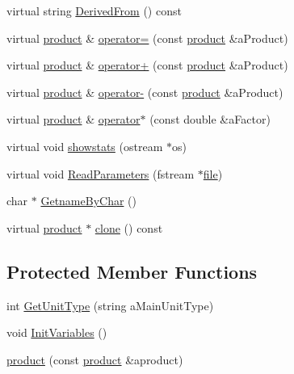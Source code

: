 \begin{DoxyCompactItemize}
virtual string \hyperlink{classproduct_a57ad202aca39d005745e104f91349908}{DerivedFrom} () const 
\item 
virtual \hyperlink{classproduct}{product} \& \hyperlink{classproduct_afa55a9466d7f5a287bae17100289733e}{operator=} (const \hyperlink{classproduct}{product} \&aProduct)
\item 
virtual \hyperlink{classproduct}{product} \& \hyperlink{classproduct_aa7ec97f48aa6b8c4549359aeb07fdfb8}{operator+} (const \hyperlink{classproduct}{product} \&aProduct)
\item 
virtual \hyperlink{classproduct}{product} \& \hyperlink{classproduct_aad3b7e2ec5a3a9dfe3199ea7575a4f8f}{operator-\/} (const \hyperlink{classproduct}{product} \&aProduct)
\item 
virtual \hyperlink{classproduct}{product} \& \hyperlink{classproduct_a4fd6f2e5bf35b7a28275600fbd0b2031}{operator$\ast$} (const double \&aFactor)
\item 
virtual void \hyperlink{classproduct_a1151ea416ab90047f8d087be57a6d7b1}{showstats} (ostream $\ast$os)
\item 
virtual void \hyperlink{classproduct_a1edb3e3d0619a2db8b8f1c95fed582ce}{ReadParameters} (fstream $\ast$\hyperlink{classbase_a3af52ee9891719d09b8b19b42450b6f6}{file})
\item 
char $\ast$ \hyperlink{classproduct_a28d4c7421c7991066be1399f8b924116}{GetnameByChar} ()
\item 
virtual \hyperlink{classproduct}{product} $\ast$ \hyperlink{classproduct_a18a1df87f3400774db21d1e8c573f04a}{clone} () const 
\end{DoxyCompactItemize}
\subsection*{Protected Member Functions}
\begin{DoxyCompactItemize}
\item 
int \hyperlink{classproduct_ab4131ddca9cae217890cfbd347e003d2}{GetUnitType} (string aMainUnitType)
\item 
void \hyperlink{classproduct_afcbfb1feadfd4ed057845eab47e37ff5}{InitVariables} ()
\item 
\hyperlink{classproduct_ac130281dfe8e31f86305414d45527a83}{product} (const \hyperlink{classproduct}{product} \&aproduct)
\end{DoxyCompactItemize}
